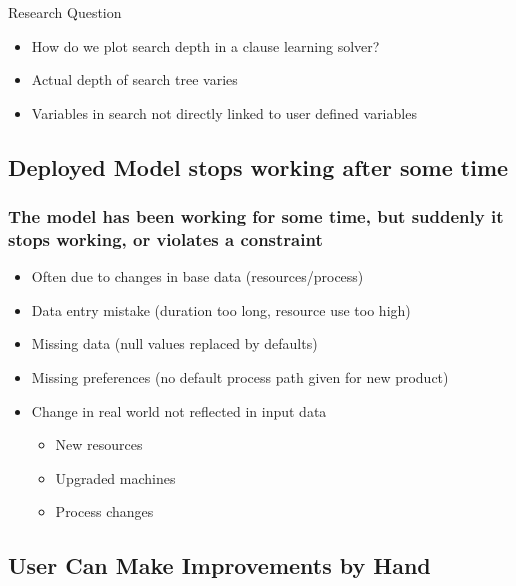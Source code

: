 \documentclass[dvipsnames,aspectratio=169]{beamer}
\begin{document}
\begin{frame}{Research Question}
    \begin{itemize}
        \item How do we plot search depth in a clause learning solver?
        \item Actual depth of search tree varies 
        \item Variables in search not directly linked to user defined variables
    \end{itemize}
\end{frame}



\subsection*{Deployed Model stops working after some time}

\begin{frame}
\frametitle{The model has been working for some time, but suddenly it stops working, or violates a constraint}
\begin{itemize}
\item Often due to changes in base data (resources/process)
\item Data entry mistake (duration too long,  resource use too high)
\item Missing data (null values replaced by defaults)
  \item Missing preferences (no default process path given for new product)
\item Change in real world not reflected in input data
  \begin{itemize}
  \item New resources
  \item Upgraded machines
    \item Process changes
\end{itemize}
\end{itemize}
\end{frame}

\subsection*{User Can Make Improvements by Hand}
\end{document}
